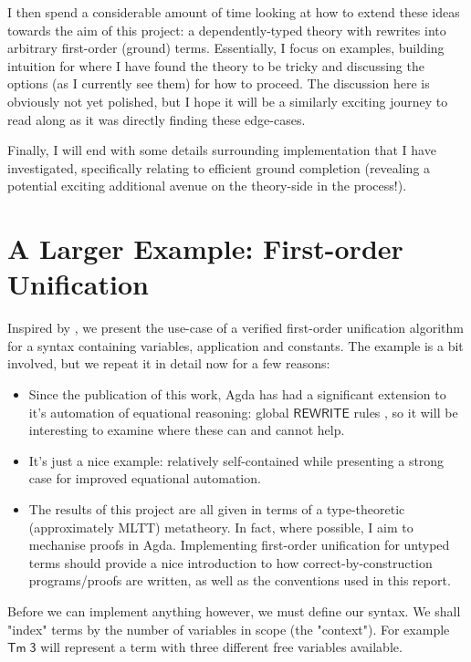 \documentclass[
    a4paper, %
    fontsize=9.5pt, %
    twoside=false, %
	numbers=noenddot, %
	fontmethod=tex, %
]{kaobook}
\newcommand{\Conid}[1]{\mathit{#1}}
\newcommand{\Varid}[1]{\mathit{#1}}
\renewcommand\Varid[1]{\mathord{\textsf{#1}}}
\let\Conid\Varid
\begin{document}
I then spend a considerable amount of time looking at how to extend these ideas
towards the aim of this project: a dependently-typed theory with rewrites into 
arbitrary first-order (ground) terms. Essentially, I focus on examples, building
intuition for where I have found the theory to be tricky and discussing the
options (as I currently see them) for how to proceed.
The discussion here is obviously not yet polished, but I hope it will be
a similarly exciting journey to read along as it was directly finding these
edge-cases.

Finally, I will end with some details surrounding implementation that I have 
investigated, specifically relating to efficient ground completion (revealing
a potential exciting additional avenue on the theory-side in the process!).






\section{A Larger Example: First-order Unification}



Inspired by , we present the use-case of
a verified first-order unification algorithm for a syntax containing variables, 
application and constants. The example is a bit involved, but we repeat it in
detail now for a few reasons:
\begin{itemize}
  \item Since the publication of this work, Agda has had a significant extension
  to it's automation of equational reasoning: global \ensuremath{\Conid{REWRITE}} rules
  , so it will be
  interesting to examine where these can and cannot help.
  \item It's just a nice example: relatively self-contained while presenting a
  strong case for improved equational automation.
  \item The results of this project are all given in terms of a type-theoretic
  (approximately MLTT) metatheory. In fact, where possible, I aim to mechanise
  proofs in Agda. Implementing first-order unification for untyped terms should
  provide a nice introduction to how correct-by-construction programs/proofs are
  written, as well as the conventions used in this report.
\end{itemize}

Before we can implement anything however, we must define our syntax. 
We shall "index" terms by the number of variables in scope (the "context"). For 
example \ensuremath{\Conid{Tm}\;\Varid{3}} will represent a term with three different free variables 
available.
\end{document}

